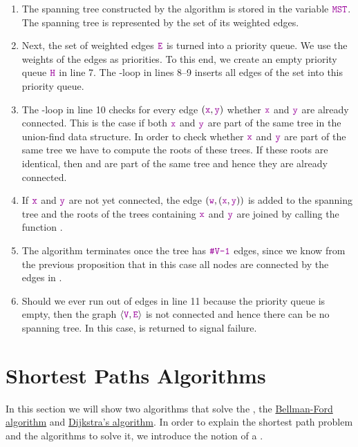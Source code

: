 \begin{enumerate}
\item The spanning tree constructed by the algorithm is stored in the variable $\mytt{MST}$.
      The spanning tree is represented by the set of its weighted edges.  
\item Next, the set of weighted edges $\mytt{E}$ is turned into a priority queue.
      We use the weights of the edges as priorities. 
      To this end, we create an empty priority queue $\mytt{H}$ in line 7.
      The -loop in lines 8--9 inserts all edges of the set  into this priority queue.
\item The -loop in line 10 checks for every edge $(\mytt{x},\mytt{y})$  whether $\mytt{x}$ and $\mytt{y}$ are already
      connected.  This is the case if both $\mytt{x}$ and $\mytt{y}$ are part of the same tree
      in the union-find data structure.  In order to
      check whether $\mytt{x}$ and $\mytt{y}$ are part of the same tree
      we have to compute the roots of these trees. 
      If these roots are identical, then  and  are part of the same tree and hence
      they are already connected. 
\item If $\mytt{x}$ and $\mytt{y}$ are not yet connected, the  edge $(\mytt{w}, (\mytt{x}, \mytt{y}))$ is added to the
      spanning tree and the roots of the trees containing $\mytt{x}$ and $\mytt{y}$ are joined by calling the function
      .
\item The algorithm terminates once the tree  has $\mytt{\#V-1}$ edges, since we know from the previous
      proposition that in this case all nodes are connected by the edges in .
\item Should we ever run out of edges in line 11 because the priority queue  is empty, then the graph
      $\langle \mytt{V}, \mytt{E} \rangle$ is not connected and hence there can be no spanning tree.
      In this case,   is returned to signal failure.
\end{enumerate}


\section{Shortest Paths Algorithms}
In this section we will show two algorithms that solve the
\href{https://en.wikipedia.org/wiki/Shortest_path_problem}{}, the 
\href{https://en.wikipedia.org/wiki/Bellman-Ford_algorithm}{Bellman-Ford algorithm} and
\href{https://en.wikipedia.org/wiki/Dijkstra%27s_algorithm}{Dijkstra's algorithm}.  
In order to explain the shortest path problem and the algorithms to solve it, we introduce the notion
of a \href{https://en.wikipedia.org/wiki/Directed_graph}{}.


